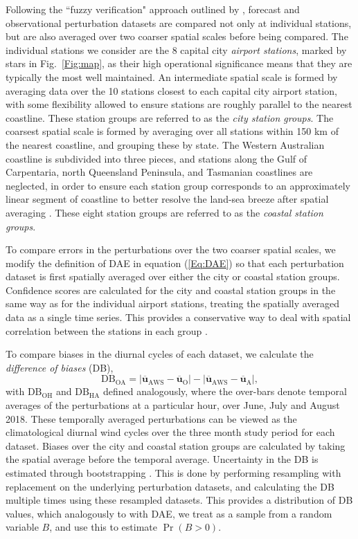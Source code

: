 \documentclass{ametsoc}
\DeclareMathOperator{\pr}{Pr}
\begin{document}
Following the ``fuzzy verification" approach outlined by \citet{ebert08}, forecast and observational perturbation datasets are compared not only at individual stations, but are also averaged over two coarser spatial scales before being compared. The individual stations we consider are the 8 capital city \textit{airport stations}, marked by stars in Fig.~\ref{Fig:map}, as their high operational significance means that they are typically the most well maintained. An intermediate spatial scale is formed by averaging data over the 10 stations closest to each capital city airport station, with some flexibility allowed to ensure stations are roughly parallel to the nearest coastline. These station groups are referred to as the \textit{city station groups}. The coarsest spatial scale is formed by averaging over all stations within 150 km of the nearest coastline, and grouping these by state. The Western Australian coastline is subdivided into three pieces, and stations along the Gulf of Carpentaria, north Queensland Peninsula, and Tasmanian coastlines are neglected, in order to ensure each station group corresponds to an approximately linear segment of coastline to better resolve the land-sea breeze after spatial averaging \citep[e.g.][]{vincent16}. These eight station groups are referred to as the \textit{coastal station groups}. 

To compare errors in the perturbations over the two coarser spatial scales, we modify the definition of DAE in equation (\ref{Eq:DAE}) so that each perturbation dataset is first spatially averaged over either the city or coastal station groups. Confidence scores are calculated for the city and coastal station groups in the same way as for the individual airport stations, treating the spatially averaged data as a single time series. This provides a conservative way to deal with spatial correlation between the stations in each group \citep{griffiths17}. 

To compare biases in the diurnal cycles of each dataset, we calculate the \textit{difference of biases} (DB),
\begin{equation}
\text{DB}_{\text{OA}} = \left\lvert \overline{\boldsymbol{u}}_{\text{AWS}}-\overline{\boldsymbol{u}}_{\text{O}} \right\rvert - \left\lvert \overline{\boldsymbol{u}}_{\text{AWS}}-\overline{\boldsymbol{u}}_{\text{A}} \right\rvert,
\end{equation}
with $\text{DB}_{\text{OH}}$ and $\text{DB}_{\text{HA}}$ defined analogously, where the over-bars denote temporal averages of the perturbations at a particular hour, over June, July and August 2018. These temporally averaged perturbations can be viewed as the climatological diurnal wind cycles over the three month study period for each dataset. Biases over the city and coastal station groups are calculated by taking the spatial average before the temporal average. Uncertainty in the DB is estimated through bootstrapping \citep{efron79}. This is done by performing resampling with replacement on the underlying perturbation datasets, and calculating the DB multiple times using these resampled datasets. This provides a distribution of DB values, which analogously to with DAE, we treat as a sample from a random variable $B$, and use this to estimate $\pr\left(B > 0\right)$.
\end{document}
